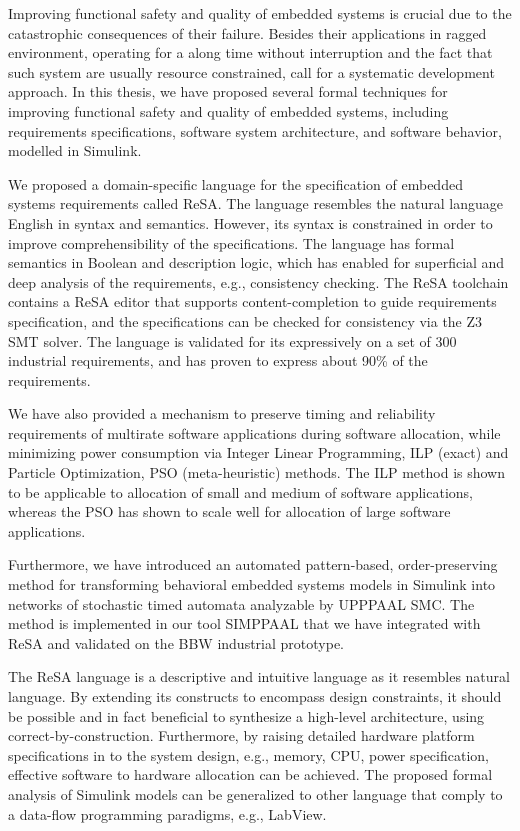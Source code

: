 Improving functional safety and quality of embedded systems is crucial due to the catastrophic consequences of their failure. Besides their applications in ragged environment, operating for a along time without interruption and the fact that such system are usually resource constrained, call for a systematic development approach. In this thesis, we have proposed several formal techniques for improving functional safety and quality of embedded systems, including requirements specifications, software system architecture, and software behavior, modelled in Simulink.

We proposed a domain-specific language for the specification of embedded systems requirements called ReSA. The language resembles the natural language English in syntax and semantics. However, its syntax is constrained in order to improve comprehensibility of the specifications. The language has formal semantics in Boolean and description logic, which has enabled for superficial and deep analysis of the requirements, e.g., consistency checking. The ReSA toolchain contains a ReSA editor that supports content-completion to guide requirements specification, and the specifications can be checked for consistency via the Z3 SMT solver. The language is validated for its expressively on a set of 300 industrial requirements, and has proven to express about 90\% of the requirements. 

We have also provided a mechanism to preserve timing and reliability requirements of multirate software applications during software allocation, while minimizing power consumption via Integer Linear Programming, ILP (exact) and Particle Optimization, PSO (meta-heuristic) methods. The ILP method is shown to be applicable to allocation of small and medium of software applications, whereas the PSO has shown to scale well for allocation of large software applications.

Furthermore, we have introduced an automated pattern-based, order-preserving method for transforming behavioral embedded systems models in Simulink into networks of stochastic timed automata analyzable by UPPPAAL SMC. The method is implemented in our tool SIMPPAAL that we have integrated with ReSA and validated on the BBW industrial prototype. 

The ReSA language is a descriptive and intuitive language as it resembles natural language. By extending its constructs to encompass design constraints, it should be possible and in fact beneficial to synthesize a high-level architecture, using correct-by-construction. Furthermore, by raising detailed hardware platform specifications in to the system design, e.g., memory, CPU, power specification, effective software to hardware allocation can be achieved. The proposed formal analysis of Simulink models can be generalized to other language that comply to a data-flow programming paradigms, e.g., LabView. 
